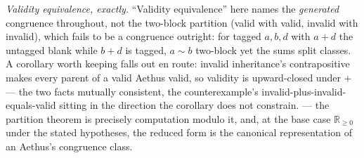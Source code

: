 
\textit{Validity equivalence, exactly.} ``Validity equivalence'' here names the \emph{generated} congruence throughout, not the two-block partition (valid with valid, invalid with invalid), which fails to be a congruence outright: for tagged $a, b, d$ with $a + d$ the untagged blank while $b + d$ is tagged, $a \sim b$ two-block yet the sums split classes. A corollary worth keeping falls out en route: invalid inheritance's contrapositive makes every parent of a valid Aethus valid, so validity is upward-closed under $+$ --- the two facts mutually consistent, the counterexample's invalid-plus-invalid-equals-valid sitting in the direction the corollary does not constrain. --- the partition theorem is precisely computation modulo it, and, at the base case $\mathbb{R}_{\ge 0}$ under the stated hypotheses, the reduced form is the canonical representation of an Aethus's congruence class.

